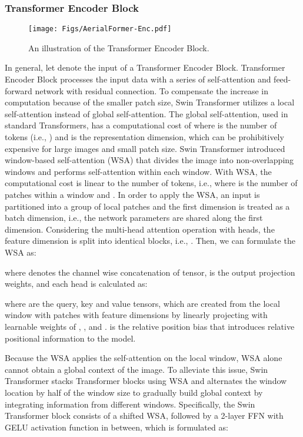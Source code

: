 \documentclass[journal]{IEEEtran}
\begin{document}
\subsubsection{Transformer Encoder Block}

\begin{figure}
    \centering
    \texttt{[image: Figs/AerialFormer-Enc.pdf]}
    \caption{An illustration of the Transformer Encoder Block. }
    \label{fig:enc_block}
\end{figure}

In general, let  denote the input of a Transformer Encoder Block. Transformer Encoder Block processes the input data with a series of self-attention and feed-forward network with residual connection. To compensate the increase in computation because of the smaller patch size, 
Swin Transformer \cite{liu2021swin} utilizes a local self-attention instead of global self-attention. The global self-attention, used in standard Transformers, has a computational cost of  where  is the number of tokens (i.e., ) and  is the representation dimension, which can be prohibitively expensive for large images and small patch size. 
Swin Transformer introduced window-based self-attention (WSA) that divides the image into non-overlapping windows and performs self-attention within each window. With WSA, the computational cost is linear to the number of tokens, i.e.,  where  is the number of patches within a window and . 
In order to apply the WSA, an input   is partitioned into a group of local patches  and the first dimension  is treated as a batch dimension, i.e., the network parameters are shared along the first dimension. 
Considering the multi-head attention operation with  heads, the feature dimension  is split into  identical blocks, i.e., . Then, we can formulate the WSA as:



where  denotes the channel wise concatenation of tensor,  is the output projection weights, and each head  is calculated as:


where  are the query, key and value tensors, which are created from the local window with  patches with  feature dimensions by linearly projecting with learnable weights of , , and .  is the relative position bias \cite{liu2021swin} that introduces relative positional information to the model. 

Because the WSA applies the self-attention on the local window, WSA alone cannot obtain a global context of the image. To alleviate this issue, Swin Transformer stacks Transformer blocks using WSA and alternates the window location by half of the window size to gradually build global context by integrating information from different windows. Specifically, the Swin Transformer block consists of a shifted WSA, followed by a 2-layer FFN with GELU activation function in between, which is formulated as:
\end{document}
